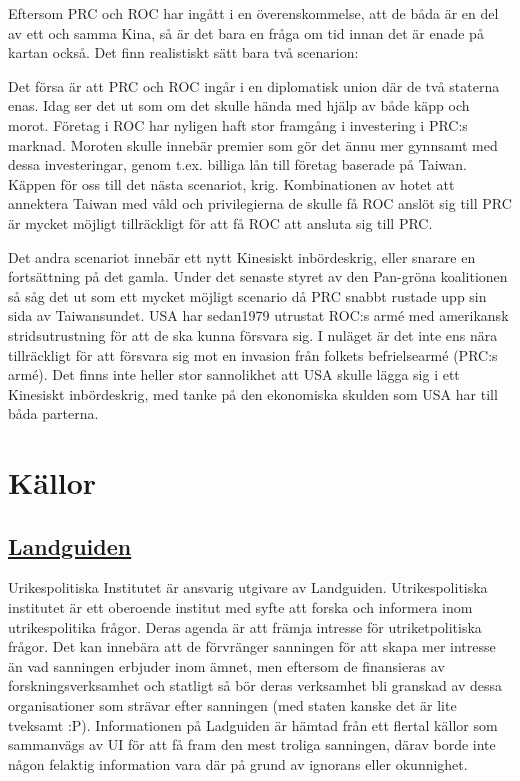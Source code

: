 \documentclass[a4paper,10pt]{article}
\begin{document}
Eftersom PRC och ROC har ingått i en överenskommelse, att de båda är en del av ett och samma Kina, så är det bara en fråga om tid innan det är enade på kartan också. Det finn realistiskt sätt bara två scenarion:

Det försa är att PRC och ROC ingår i en diplomatisk union där de två staterna enas. Idag ser det ut som om det skulle hända med hjälp av både käpp och morot. Företag i ROC har nyligen haft stor framgång i investering i PRC:s marknad. Moroten skulle innebär premier som gör det ännu mer gynnsamt med dessa investeringar, genom t.ex. billiga lån till företag baserade på Taiwan. Käppen för oss till det nästa scenariot, krig. Kombinationen av hotet att annektera Taiwan med våld och privilegierna de skulle få ROC anslöt sig till PRC är mycket möjligt tillräckligt för att få ROC att ansluta sig till PRC.

Det andra scenariot innebär ett nytt Kinesiskt inbördeskrig, eller snarare en fortsättning på det gamla. Under det senaste styret av den Pan-gröna koalitionen så såg det ut som ett mycket möjligt scenario då PRC snabbt rustade upp sin sida av Taiwansundet. USA har sedan1979 utrustat ROC:s armé med amerikansk stridsutrustning för att de ska kunna försvara sig. I nuläget är det inte ens nära tillräckligt för att försvara sig mot en invasion från folkets befrielsearmé (PRC:s armé). Det finns inte heller stor sannolikhet att USA skulle lägga sig i ett Kinesiskt inbördeskrig, med tanke på den ekonomiska skulden som USA har till båda parterna.

\section*{Källor}
\subsection*{\href{https://www.landguiden.se/Lander/Asien/Taiwan}{Landguiden}}
Urikespolitiska Institutet är ansvarig utgivare av Landguiden. Utrikespolitiska institutet är ett oberoende institut med syfte att forska och informera inom utrikespolitika frågor. Deras agenda är att främja intresse för utriketpolitiska frågor. Det kan innebära att de förvränger sanningen för att skapa mer intresse än vad sanningen erbjuder inom ämnet, men eftersom de finansieras av forskningsverksamhet och statligt så bör deras verksamhet bli granskad av dessa organisationer som strävar efter sanningen (med staten kanske det är lite tveksamt :P). Informationen på Ladguiden är hämtad från ett flertal källor som sammanvägs av UI för att få fram den mest troliga sanningen, därav borde inte någon felaktig information vara där på grund av ignorans eller okunnighet. 
\end{document}
